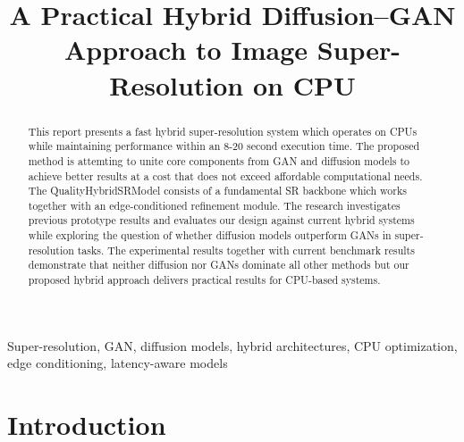 \documentclass[conference]{IEEEtran}
\begin{document}
\title{A Practical Hybrid Diffusion--GAN Approach to Image Super-Resolution on CPU}

\author{
\and
{}
}

\maketitle

\begin{abstract}
This report presents a fast hybrid super-resolution system which operates on CPUs while maintaining performance within an 8-20 second execution time. The proposed method is attemting to unite core components from GAN and diffusion models to achieve better results at a cost that does not exceed affordable computational needs. The QualityHybridSRModel consists of a fundamental SR backbone which works together with an edge-conditioned refinement module. The research investigates previous prototype results and evaluates our design against current hybrid systems while exploring the question of whether diffusion models outperform GANs in super-resolution tasks. 
The experimental results together with current benchmark results demonstrate that neither diffusion nor GANs dominate all other methods but our proposed hybrid approach delivers practical results for CPU-based systems.
\end{abstract}

\begin{IEEEkeywords}
Super-resolution, GAN, diffusion models, hybrid architectures, CPU optimization, edge conditioning, latency-aware models
\end{IEEEkeywords}

\section{Introduction}
\end{document}

